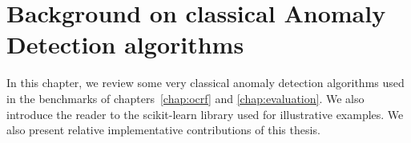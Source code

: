 

\chapter{Background on classical Anomaly Detection algorithms}
\label{back:AD_scikit}
\begin{chapabstract}
  In this chapter, we review some very classical anomaly detection algorithms used in the benchmarks of chapters~\ref{chap:ocrf} and \ref{chap:evaluation}. We also introduce the reader to the scikit-learn library used for illustrative examples. We also present relative implementative contributions of this thesis.%
\end{chapabstract}

